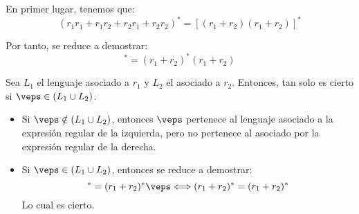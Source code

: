 \documentclass[12pt]{article}
\begin{document}
\begin{ejercicio}[1.25 puntos]
\begin{enumerate}
            En primer lugar, tenemos que:
            \begin{equation*}
                (r_1 r_1 + r_1 r_2 + r_2 r_1 + r_2 r_2)^*
                = [(r_1 + r_2)(r_1 + r_2)]^*
            \end{equation*}

            Por tanto, se reduce a demostrar:
            \begin{equation*}
                [(r_1 + r_2)(r_1 + r_2)]^* = (r_1 + r_2)^*(r_1 + r_2)
            \end{equation*}
            
            Sea $L_1$ el lenguaje asociado a $r_1$ y $L_2$ el asociado a $r_2$. Entonces, tan solo es cierto si $\veps\in (L_1\cup L_2)$.
            \begin{itemize}
                \item Si $\veps\notin (L_1\cup L_2)$, entonces $\veps$ pertenece al lenguaje asociado a la expresión regular de la izquierda, pero no pertenece al asociado por la expresión regular de la derecha.
                \item Si $\veps\in (L_1\cup L_2)$, entonces se reduce a demostrar:
                \begin{equation*}
                    [(r_1 + r_2)\veps]^* = (r_1 + r_2)^*\veps
                    \Longleftrightarrow
                    (r_1 + r_2)^* = (r_1 + r_2)^*
                \end{equation*}
                Lo cual es cierto.
            \end{itemize}
        \end{enumerate}
    \end{ejercicio}
\end{document}
